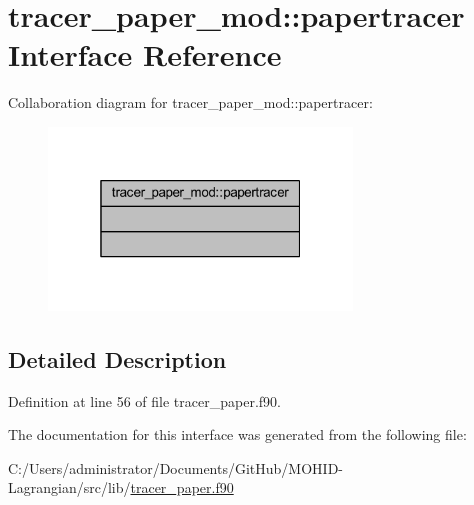 \hypertarget{interfacetracer__paper__mod_1_1papertracer}{}\section{tracer\+\_\+paper\+\_\+mod\+:\+:papertracer Interface Reference}
\label{interfacetracer__paper__mod_1_1papertracer}


Collaboration diagram for tracer\+\_\+paper\+\_\+mod\+:\+:papertracer\+:\nopagebreak
\begin{figure}[H]
\begin{center}
\leavevmode
\includegraphics[width=229pt]{interfacetracer__paper__mod_1_1papertracer__coll__graph}
\end{center}
\end{figure}


\subsection{Detailed Description}


Definition at line 56 of file tracer\+\_\+paper.\+f90.



The documentation for this interface was generated from the following file\+:\begin{DoxyCompactItemize}
\item 
C\+:/\+Users/administrator/\+Documents/\+Git\+Hub/\+M\+O\+H\+I\+D-\/\+Lagrangian/src/lib/\mbox{\hyperlink{tracer__paper_8f90}{tracer\+\_\+paper.\+f90}}\end{DoxyCompactItemize}
